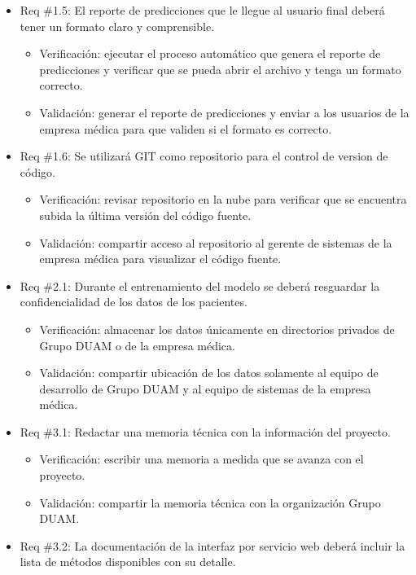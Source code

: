 \documentclass[
11pt, %
]{charter}
\begin{document}
\begin{itemize}
\begin{itemize}
	\end{itemize}
	\item Req \#1.5: El reporte de predicciones que le llegue al usuario final deberá tener un formato claro y comprensible.
	\begin{itemize}
		\item Verificación: ejecutar el proceso automático que genera el reporte de predicciones y verificar que se pueda abrir el archivo y tenga un formato correcto.
		\item Validación: generar el reporte de predicciones y enviar a los usuarios de la empresa médica para que validen si el formato es correcto.
	\end{itemize}
	\item Req \#1.6: Se utilizará GIT como repositorio para el control de version de código.
	\begin{itemize}
		\item Verificación: revisar repositorio en la nube para verificar que se encuentra subida la última versión del código fuente.
		\item Validación: compartir acceso al repositorio al gerente de sistemas de la empresa médica para visualizar el código fuente.
	\end{itemize}	
	\item Req \#2.1: Durante el entrenamiento del modelo se deberá resguardar la confidencialidad de los datos de los pacientes.	
	\begin{itemize}
		\item Verificación: almacenar los datos únicamente en directorios privados de Grupo DUAM o de la empresa médica.
		\item Validación: compartir ubicación de los datos solamente al equipo de desarrollo de Grupo DUAM y al equipo de sistemas de la empresa médica.
	\end{itemize}
	\item Req \#3.1: Redactar una memoria técnica con la información del proyecto.
	\begin{itemize}
		\item Verificación: escribir una memoria a medida que se avanza con el proyecto.
		\item Validación: compartir la memoria técnica con la organización Grupo DUAM.
	\end{itemize}
	\item Req \#3.2: La documentación de la interfaz por servicio web deberá incluir la lista de métodos disponibles con su detalle.
	\begin{itemize}

\end{itemize}
\end{itemize}
\end{document}
